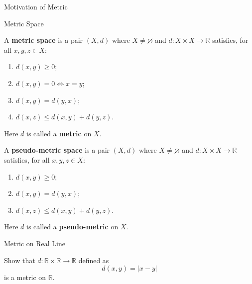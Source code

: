 \documentclass[12pt, a4paper]{article}
\begin{document}
\FrontPage
\Large

\begin{heading}
    Motivation of Metric
\end{heading}

\clearpage

\begin{heading}
    Metric Space
\end{heading}

\vspace{10pt}

\begin{definition}
    A \textbf{metric space} is a pair $(X,d)$ where $X\neq\varnothing$ and
    $d:X\times X\to\mathbb{R}$ satisfies, for all $x,y,z\in X$:
    \begin{enumerate}[label=(M\arabic*)]
    \item $d(x,y)\ge 0$;
    \item $d(x,y)=0 \iff x=y$;
    \item $d(x,y)=d(y,x)$;
    \item $d(x,z)\le d(x,y)+d(y,z)$.
    \end{enumerate}
    Here $d$ is called a \textbf{metric} on $X$.
\end{definition}

\clearpage

\begin{definition}
    A \textbf{pseudo-metric space} is a pair $(X,d)$ where $X\neq\varnothing$ and
    $d:X\times X\to\mathbb{R}$ satisfies, for all $x,y,z\in X$:
    \begin{enumerate}[label=(PM\arabic*)]
    \item $d(x,y)\ge 0$;
    \item $d(x,y)=d(y,x)$;
    \item $d(x,z)\le d(x,y)+d(y,z)$.
    \end{enumerate}
    Here $d$ is called a \textbf{pseudo-metric} on $X$.
\end{definition}

\clearpage

\begin{heading}
    Metric on Real Line
\end{heading}

\vspace{10pt}

\begin{theorem}
    Show that $d:\mathbb{R}\times\mathbb{R}\to\mathbb{R}$ defined as
    \[
        d(x,y)=|x-y|
    \]
    is a metric on $\mathbb{R}$.
\end{theorem}
\end{document}
